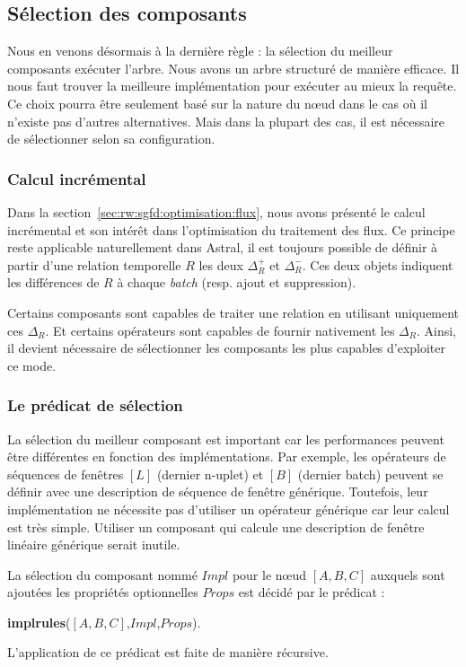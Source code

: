 \subsection{Sélection des composants}
Nous en venons désormais à la dernière règle : la sélection du meilleur composants exécuter l'arbre. Nous avons un arbre structuré de manière efficace. Il nous faut trouver la meilleure implémentation pour exécuter au mieux la requête. Ce choix pourra être seulement basé sur la nature du nœud dans le cas où il n'existe pas d'autres alternatives. Mais dans la plupart des cas, il est nécessaire de sélectionner selon sa configuration.

\subsubsection{Calcul incrémental}
Dans la section~\ref{sec:rw:sgfd:optimisation:flux}, nous avons présenté le calcul incrémental et son intérêt dans l'optimisation du traitement des flux. Ce principe reste applicable naturellement dans Astral, il est toujours possible de définir à partir d'une relation temporelle $R$ les deux $\Delta_R^+$ et $\Delta_R^-$. Ces deux objets indiquent les différences de $R$ à chaque \textit{batch} (resp. ajout et suppression). 

Certains composants sont capables de traiter une relation en utilisant uniquement ces $\Delta_R$. Et certains opérateurs sont capables de fournir nativement les $\Delta_R$. Ainsi, il devient nécessaire de sélectionner les composants les plus capables d'exploiter ce mode.

\subsubsection{Le prédicat de sélection}
La sélection du meilleur composant est important car les performances peuvent être différentes en fonction des implémentations. Par exemple, les opérateurs de séquences de fenêtres $[L]$ (dernier n-uplet) et $[B]$ (dernier batch) peuvent se définir avec une description de séquence de fenêtre générique. Toutefois, leur implémentation ne nécessite pas d'utiliser un opérateur générique car leur calcul est très simple. Utiliser un composant qui calcule une description de fenêtre linéaire générique serait inutile.

\begin{regle}
La sélection du composant nommé $Impl$ pour le nœud $[A,B,C]$ auxquels sont ajoutées les propriétés optionnelles $Props$ est décidé par le prédicat :
\begin{center} \textbf{implrules}($[A,B,C]$,$Impl$,$Props$).\end{center}
L'application de ce prédicat est faite de manière récursive.
\end{regle}

